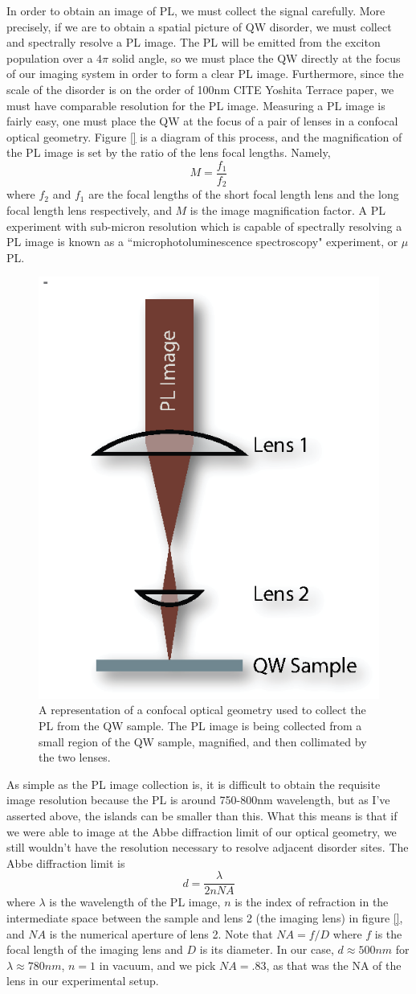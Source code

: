 \indent In order to obtain an image of PL, we must collect the signal carefully. More precisely, if we are to obtain a spatial picture of QW disorder, we must collect and spectrally resolve a PL image. The PL will be emitted from the exciton population over a $4 \pi$ solid angle, so we must place the QW directly at the focus of our imaging system in order to form a clear PL image. Furthermore, since the scale of the disorder is on the order of 100nm CITE Yoshita Terrace paper, we must have comparable resolution for the PL image. Measuring a PL image is fairly easy, one must place the QW at the focus of a pair of lenses in a confocal optical geometry. Figure \ref{} is a diagram of this process, and the magnification of the PL image is set by the ratio of the lens focal lengths. Namely,
\begin{equation}
M = \frac{f_1}{f_2}
\end{equation}
where $f_2$ and $f_1$ are the focal lengths of the short focal length lens and the long focal length lens respectively, and $M$ is the image magnification factor. A PL experiment with sub-micron resolution which is capable of spectrally resolving a PL image is known as a ``microphotoluminescence spectroscopy" experiment, or $\mu$PL.
\begin{figure}[h!]
\label{confocal}
\centering
\includegraphics[width = .3\textwidth]{confocal.eps}
\caption{\doublespacing A representation of a confocal optical geometry used to collect the PL from the QW sample. The PL image is being collected from a small region of the QW sample, magnified, and then collimated by the two lenses.}
\end{figure}

\indent As simple as the PL image collection is, it is difficult to obtain the requisite image resolution because the PL is around 750-800nm wavelength, but as I've asserted above, the islands can be smaller than this. What this means is that if we were able to image at the Abbe diffraction limit of our optical geometry, we still wouldn't have the resolution necessary to resolve adjacent disorder sites. The Abbe diffraction limit is
\begin{equation}
d = \frac{\lambda}{2nNA}
\end{equation}
where $\lambda$ is the wavelength of the PL image, $n$ is the index of refraction in the intermediate space between the sample and lens 2 (the imaging lens) in figure \ref{}, and $NA$ is the numerical aperture of lens 2. Note that $NA = f / D$ where $f$ is the focal length of the imaging lens and $D$ is its diameter. In our case, $d \approx 500 nm$ for $\lambda \approx 780 nm$, $n = 1$ in vacuum, and we pick $NA = .83$, as that was the NA of the lens in our experimental setup. 

